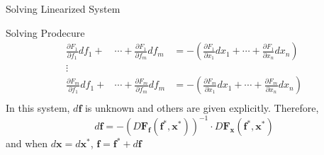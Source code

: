 \documentclass[a4paper,11pt]{article}
\newcommand{\bd}{\mathbf}
\newcommand{\p}{\partial}
\begin{document}
\begin{frame}[t]{Solving Linearized System}
	\begin{block}
		{Solving Prodecure}
		\begin{align*}
			\frac{\p F_1}{\p f_1}df_1 + 
			&\cdots + \frac{\p F_1}{\p f_m}df_m 
			&= -\left(\frac{\p F_1}{\p x_1}dx_1 + 
			\cdots + \frac{\p F_1}{\p x_n}dx_n \right) \\
			\vdots
			\\
			\frac{\p F_m}{\p f_1}df_1 + 
			&\cdots + \frac{\p F_m}{\p f_m}df_m 
			&= -\left( \frac{\p F_m}{\p x_1}dx_1 + \cdots + \frac{\p F_m}{\p x_n}dx_n\right) \\
		\end{align*}
		In this system, $d\bd{f}$ is unknown and others are given explicitly. Therefore, 
		\[
			d\bd{f} = - (D{\bd F}_{\bd {f}}(\bd{f}^\ast,\bd{x}^\ast))^{-1} \cdot D{\bd F_{\bd{x}}}(\bd{f}^\ast,\bd{x}^\ast)
		\]
		and when $d\bd{x}=d\bd{x}^\ast$, $\bd{f}=\bd{f}^\ast + d\bd{f}$
	\end{block}
\end{frame}
\end{document}
